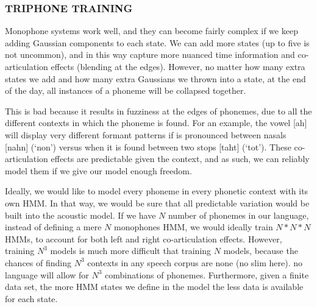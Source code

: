 \documentclass[10pt,a4paper]{article}
\begin{document}
\subsubsection*{TRIPHONE TRAINING}

  Monophone systems work well, and they can become fairly complex if we keep adding Gaussian components to each state. We can add more states (up to five is not uncommon), and in this way capture more nuanced time information and co-articulation effects (blending at the edges). However, no matter how many extra states we add and how many extra Gaussians we thrown into a state, at the end of the day, all instances of a phoneme will be collapsed together.

  This is bad because it results in fuzziness at the edges of phonemes, due to all the different contexts in which the phoneme is found. For an example, the vowel [ah] will display very different formant patterns if is pronounced between nasals [nahn] (`non') versus when it is found between two stops [taht] (`tot'). These co-articulation effects are predictable given the context, and as such, we can reliably model them if we give our model enough freedom.

  Ideally, we would like to model every phoneme in every phonetic context with its own HMM. In that way, we would be sure that all predictable variation would be built into the acoustic model. If we have $N$ number of phonemes in our language, instead of defining a mere $N$ monophones HMM, we would ideally train $N*N*N$ HMMs, to account for both left and right co-articulation effects. However, training $N^3$ models is much more difficult that training $N$ models, because the chances of finding $N^3$ contexts in any speech corpus are none (no slim here). no language will allow for $N^3$ combinations of phonemes. Furthermore, given a finite data set, the more HMM states we define in the model the less data is available for each state.
  
\end{document}
